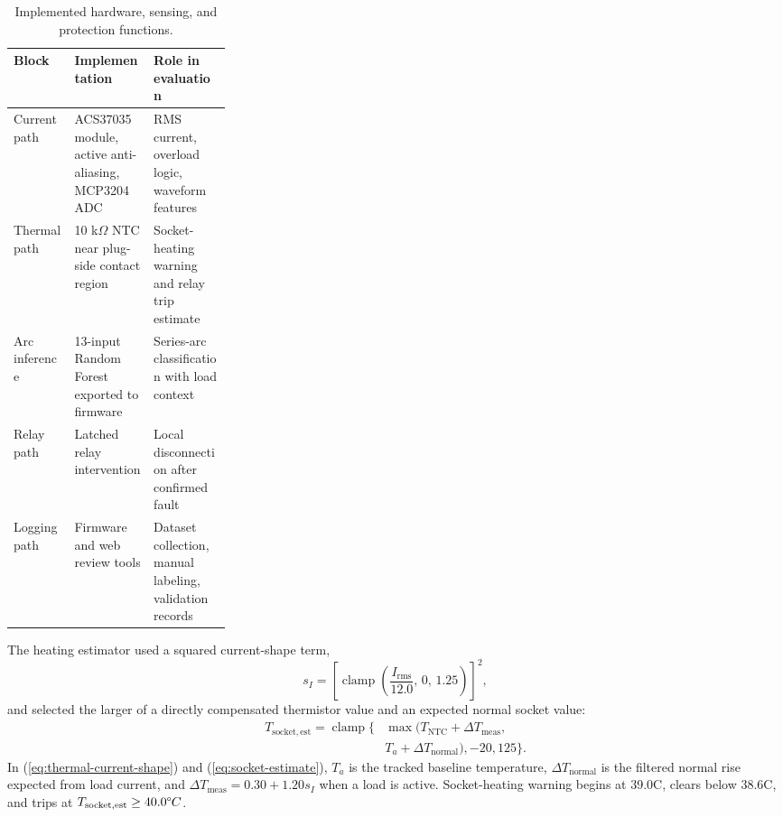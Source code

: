 \documentclass[twocolumn,twoside]{base/ajstd}
\begin{document}
\begin{table}[!t]
  	\centering\footnotesize\sffamily
  	\caption{Implemented hardware, sensing, and protection functions.}
  	\begin{tableminipage}{\linewidth}
    	\begin{tabularx}{\linewidth}{p{0.28\linewidth}YY}
			\toprule
            Block & Implementation & Role in evaluation \\
	    	\midrule
            Current path & ACS37035 module, active anti-aliasing, MCP3204 ADC & RMS current, overload logic, waveform features \\
            Thermal path & 10 k$\Omega$ NTC near plug-side contact region & Socket-heating warning and relay trip estimate \\
            Arc inference & 13-input Random Forest exported to firmware & Series-arc classification with load context \\
            Relay path & Latched relay intervention & Local disconnection after confirmed fault \\
            Logging path & Firmware and web review tools & Dataset collection, manual labeling, validation records \\
            \bottomrule
    	\end{tabularx}
        \label{tab:design-summary}
  	\end{tableminipage}
\end{table}

The heating estimator used a squared current-shape term,
\begin{equation}
  s_I=\left[\operatorname{clamp}\left(\frac{I_{\mathrm{rms}}}{12.0},\,0,\,1.25\right)\right]^2,
  \label{eq:thermal-current-shape}
\end{equation}
and selected the larger of a directly compensated thermistor value and an expected normal socket value:
\begin{equation}
  \begin{aligned}
  T_{\mathrm{socket,est}}=
  \operatorname{clamp}\{&\max(T_{\mathrm{NTC}}+\Delta T_{\mathrm{meas}},\\
  &T_a+\Delta T_{\mathrm{normal}}),-20,125\}.
  \end{aligned}
  \label{eq:socket-estimate}
\end{equation}
In (\ref{eq:thermal-current-shape}) and (\ref{eq:socket-estimate}), $T_a$ is the tracked baseline temperature, $\Delta T_{\mathrm{normal}}$ is the filtered normal rise expected from load current, and $\Delta T_{\mathrm{meas}}=0.30+1.20s_I$ when a load is active. Socket-heating warning begins at 39.0\degree C, clears below 38.6\degree C, and trips at $T_{\mathrm{socket,est}}\geq 40.0\degree C$.
\end{document}
